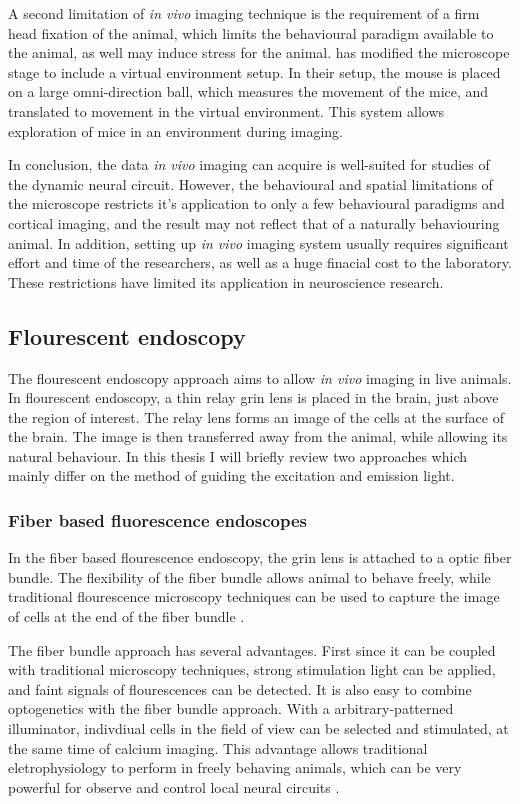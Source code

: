 A second limitation of \textit{in vivo} imaging technique is the requirement of a firm head fixation of the animal, which limits the behavioural paradigm available to the animal, as well may induce stress for the animal.  has modified the microscope stage to include a virtual environment setup. In their setup, the mouse is placed on a large omni-direction ball, which measures the movement of the mice, and translated to movement in the virtual environment. This system allows exploration of mice in an environment during imaging. 

In conclusion, the data \textit{in vivo} imaging can acquire is well-suited for studies of the dynamic neural circuit. However, the behavioural and spatial limitations of the microscope restricts it's application to only a few behavioural paradigms and cortical imaging, and the result may not reflect that of a naturally behaviouring animal. In addition, setting up \textit{in vivo} imaging system usually requires significant effort and time of the researchers, as well as a huge finacial cost to the laboratory. These restrictions have limited its application in neuroscience research. 


\subsection{Flourescent endoscopy}

The flourescent endoscopy approach aims to allow \textit{in vivo} imaging in live animals. In flourescent endoscopy, a thin relay \gls{grin} lens is placed in the brain, just above the region of interest. The relay lens forms an image of the cells at the surface of the brain. The image is then transferred away from the animal, while allowing its natural behaviour. In this thesis I will briefly review two approaches which mainly differ on the method of guiding the excitation and emission light. 

\subsubsection{Fiber based fluorescence endoscopes}
In the fiber based flourescence endoscopy, the \gls{grin} lens is attached to a optic fiber bundle. The flexibility of the fiber bundle allows animal to behave freely, while traditional flourescence microscopy techniques can be used to capture the image of cells at the end of the fiber bundle \citep{flusberg08}. 

The fiber bundle approach has several advantages. First since it can be coupled with traditional microscopy techniques, strong stimulation light can be applied, and faint signals of flourescences can be detected. It is also easy to combine optogenetics with the fiber bundle approach. With a arbitrary-patterned illuminator, indivdiual cells in the field of view can be selected and stimulated, at the same time of calcium imaging. This advantage allows traditional eletrophysiology to perform in freely behaving animals, which can be very powerful for observe and control local neural circuits \citep{szabo14}.

